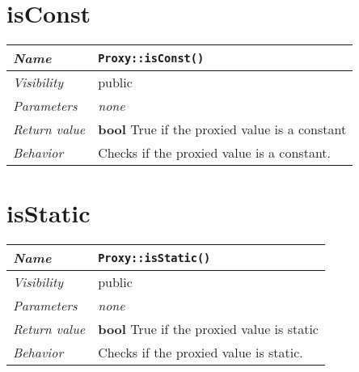  \section{isConst}
\begin{longtable}{p{3cm} @{\hskip 1cm} p{12cm}}
 \hline
\textit{Name} & \texttt{Proxy::isConst()}\\
\hline
 \textit{Visibility} & public\\
\hline
\textit{Parameters} & \textit{none}\\
\hline
\textit{Return value} & \textbf{bool} True if the proxied value is a constant \\
  \hline
 \textit{Behavior} & Checks if the proxied value is a constant. \\
\hline
\end{longtable} \pagebreak
 \section{isStatic}
\begin{longtable}{p{3cm} @{\hskip 1cm} p{12cm}}
 \hline
\textit{Name} & \texttt{Proxy::isStatic()}\\
\hline
 \textit{Visibility} & public\\
\hline
\textit{Parameters} & \textit{none}\\
\hline
\textit{Return value} & \textbf{bool} True if the proxied value is static \\
  \hline
 \textit{Behavior} & Checks if the proxied value is static. \\
\hline
\end{longtable} \pagebreak
